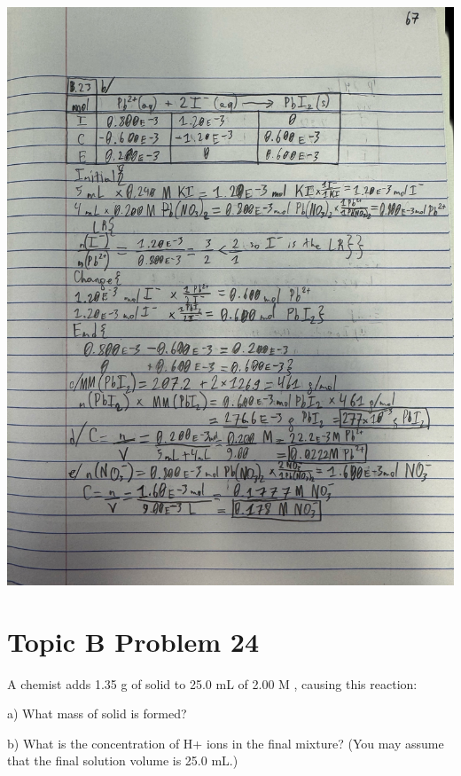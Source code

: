 \documentclass[10pt]{article}
\begin{document}
\begin{center}
                \includegraphics[width=\textwidth, trim={5in 2in 0in 6in},clip]{"Answers Images/IMG_6653.jpg"}
            \end{center}

    \pagebreak
    \section{Topic B Problem 24}
        A chemist adds 1.35 g of solid  to 25.0 mL of 2.00 M , causing this reaction:
        \begin{center}
        \end{center}
        
        a) What mass of solid  is formed?
        
        b) What is the concentration of H+ ions in the final mixture? 
        (You may assume that the final solution volume is 25.0 mL.)
\end{document}
